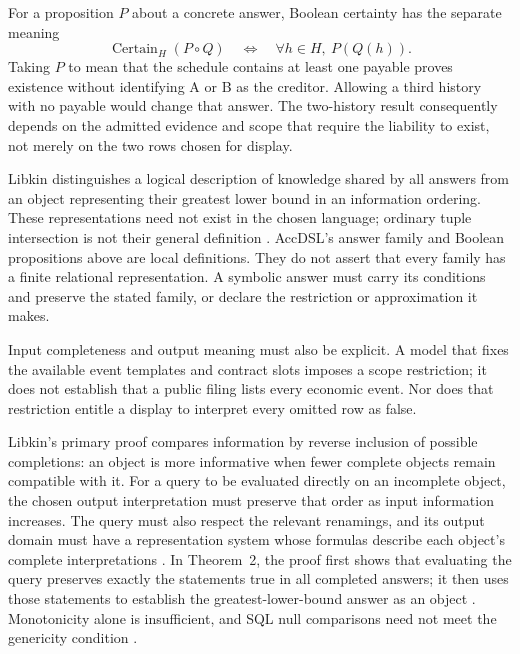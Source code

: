 For a proposition $P$ about a concrete answer, Boolean certainty has the
separate meaning
\[
 \operatorname{Certain}_H(P\circ Q)
 \quad\Longleftrightarrow\quad
 \forall h\in H,\ P(Q(h)).
\]
Taking $P$ to mean that the schedule contains at least one payable proves
existence without identifying A or B as the creditor. Allowing a third history
with no payable would change that answer. The two-history result consequently
depends on the admitted evidence and scope that require the liability to
exist, not merely on the two rows chosen for display.

Libkin distinguishes a logical description of knowledge shared by all
answers from an object representing their greatest lower bound in an
information ordering. These representations need not exist in the chosen
language; ordinary tuple intersection is not their general definition
\citep[Section~5.3, equations~(6)--(8)]{libkin2014}. AccDSL's answer family and
Boolean propositions above are local definitions. They do not assert that
every family has a finite relational representation. A symbolic answer must
carry its conditions and preserve the stated family, or declare the
restriction or approximation it makes.

Input completeness and output meaning must also be explicit. A model that
fixes the available event templates and contract slots imposes a scope
restriction; it does not establish that a public filing lists every economic
event. Nor does that restriction entitle a display to interpret every omitted
row as false.

Libkin's primary proof compares information by reverse inclusion of possible
completions: an object is more informative when fewer complete objects remain
compatible with it. For a query to be evaluated directly on an incomplete
object, the chosen output interpretation must preserve that order as input
information increases. The query must also respect the relevant renamings,
and its output domain must have a representation system whose formulas
describe each object's complete interpretations
\citep[Sections~6.1--6.2, equations~(9)--(10)]{libkin2014}. In Theorem~2, the proof
first shows that evaluating the query preserves exactly the statements true
in all completed answers; it then uses those statements to establish the
greatest-lower-bound answer as an object
\citep[Definitions~4--7 and Theorem~2, pp.~11--18]{libkin2016certain}.
Monotonicity alone is insufficient, and SQL null comparisons need not meet
the genericity condition \citep[Section~7.1, pp.~18--19]{libkin2016certain}.

